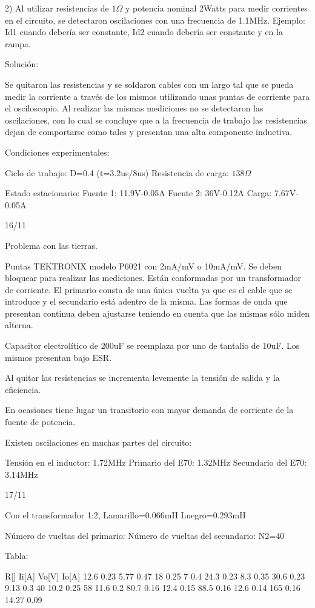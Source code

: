 2) Al utilizar resistencias de $1\Omega$ y potencia nominal 2Watts para medir corrientes en el circuito, 
se detectaron oscilaciones con una frecuencia de 1.1MHz. Ejemplo: Id1 cuando debería ser constante, 
Id2 cuando debería ser constante y en la rampa. 

Solución: 

Se quitaron las resistencias y se soldaron cables con un largo tal que se pueda medir la corriente a través de los mismos 
utilizando unas puntas de corriente para el osciloscopio. Al realizar las mismas mediciones no se detectaron las oscilaciones,
con lo cual se concluye que a la frecuencia de trabajo las resistencias dejan de comportarse como tales y presentan una alta componente inductiva. 

Condiciones experimentales:

Ciclo de trabajo: D=0.4 (t=3.2us/8us)
Resistencia de carga: $138\Omega$

Estado estacionario: 
Fuente 1: 11.9V-0.05A
Fuente 2: 36V-0.12A
Carga: 7.67V-0.05A

16/11

Problema con las tierras.

Puntas TEKTRONIX modelo P6021 con 2mA/mV o 10mA/mV. Se deben bloquear para realizar las mediciones.
Están conformadas por un transformador de corriente. 
El primario consta de una única vuelta ya que es el cable que se introduce y el secundario está adentro de la misma. 
Las formas de onda que presentan continua deben ajustarse teniendo en cuenta que las mismas sólo miden alterna. 

Capacitor electrolítico de 200uF se reemplaza por uno de tantalio de 10uF. Los mismos presentan bajo ESR. 

Al quitar las resistencias se incrementa levemente la tensión de salida y la eficiencia. 

En ocasiones tiene lugar un transitorio con mayor demanda de corriente de la fuente de potencia. 

Existen oscilaciones en muchas partes del circuito:

Tensión en el inductor: 1.72MHz
Primario del E70: 1.32MHz
Secundario del E70: 3.14MHz

17/11

Con el transformador 1:2, 
Lamarillo=0.066mH
Lnegro=0.293mH

Número de vueltas del primario: 
Número de vueltas del secundario: N2=40 

Tabla:
 

R[\Omega]       Ii[A]       Vo[V]       Io[A]
12.6            0.23        5.77        0.47
18              0.25        7           0.4
24.3            0.23        8.3         0.35
30.6            0.23        9.13        0.3
40                          10.2        0.25
58                          11.6        0.2
80.7            0.16        12.4        0.15           
88.5            0.16        12.6        0.14     
165             0.16        14.27       0.09   